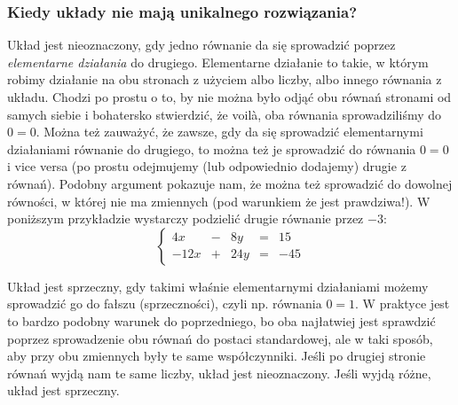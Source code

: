 \documentclass{article}
\theoremstyle{remark}
\begin{document}
\subsubsection{Kiedy układy nie mają unikalnego rozwiązania?}
Układ jest nieoznaczony, gdy jedno równanie da się sprowadzić poprzez
\textit{elementarne działania} do drugiego.
Elementarne działanie to takie, w którym robimy działanie na obu stronach z użyciem
albo liczby, albo innego równania z układu. Chodzi po prostu o to, by
nie można było odjąć obu równań stronami od samych siebie i bohatersko stwierdzić, że
voilà, oba równania sprowadziliśmy do $0=0$. Można też zauważyć, że zawsze, gdy da się
sprowadzić elementarnymi działaniami równanie do drugiego, to można też je sprowadzić do
równania $0=0$ i vice versa
(po prostu odejmujemy (lub odpowiednio dodajemy) drugie z równań). Podobny argument
pokazuje nam, że można też sprowadzić do dowolnej równości, w której nie ma zmiennych
(pod warunkiem że jest prawdziwa!).
W poniższym przykładzie wystarczy podzielić drugie równanie przez $-3$:
\begin{displaymath}
  \left\{
    \begin{array}{lllll}
      4x &-& 8y &=& 15\\
      -12x &+& 24y &=& -45
    \end{array}
  \right.
\end{displaymath}


Układ jest sprzeczny, gdy takimi właśnie elementarnymi działaniami możemy sprowadzić go
do fałszu (sprzeczności), czyli np. równania $0=1$.
W praktyce jest to bardzo podobny warunek do poprzedniego, bo oba najłatwiej jest
sprawdzić poprzez sprowadzenie obu równań do postaci standardowej, ale w taki sposób,
aby przy obu zmiennych były te same współczynniki. Jeśli po drugiej stronie równań
wyjdą nam te same liczby, układ jest nieoznaczony. Jeśli wyjdą różne, układ jest sprzeczny.
\end{document}

